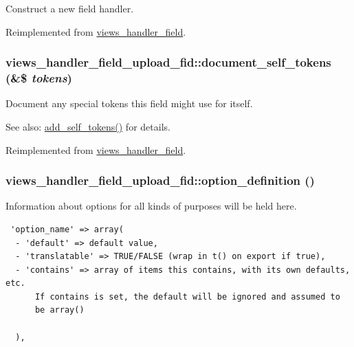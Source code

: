 Construct a new field handler. 

Reimplemented from \hyperlink{classviews__handler__field_3d50050864c255b71c842972a45d39f6}{views\_\-handler\_\-field}.\hypertarget{classviews__handler__field__upload__fid_8e3f8fc239933c8c09c723dcada273de}{
\subsubsection[{document\_\-self\_\-tokens}]{\setlength{\rightskip}{0pt plus 5cm}views\_\-handler\_\-field\_\-upload\_\-fid::document\_\-self\_\-tokens (\&\$ {\em tokens})}}
\label{classviews__handler__field__upload__fid_8e3f8fc239933c8c09c723dcada273de}


Document any special tokens this field might use for itself.

\begin{Desc}
\item[See also:]\hyperlink{classviews__handler__field__upload__fid_0366e80867739ae07af5ee910d3022be}{add\_\-self\_\-tokens()} for details. \end{Desc}


Reimplemented from \hyperlink{classviews__handler__field_e33446d1059f13fbfb06a37da04d320e}{views\_\-handler\_\-field}.\hypertarget{classviews__handler__field__upload__fid_740ca6ec94e724e23023400ddbeb5978}{
\subsubsection[{option\_\-definition}]{\setlength{\rightskip}{0pt plus 5cm}views\_\-handler\_\-field\_\-upload\_\-fid::option\_\-definition ()}}
\label{classviews__handler__field__upload__fid_740ca6ec94e724e23023400ddbeb5978}


Information about options for all kinds of purposes will be held here. 

\begin{Code}\begin{verbatim} 'option_name' => array(
  - 'default' => default value,
  - 'translatable' => TRUE/FALSE (wrap in t() on export if true),
  - 'contains' => array of items this contains, with its own defaults, etc.
      If contains is set, the default will be ignored and assumed to
      be array()

  ),
\end{verbatim}
\end{Code}

